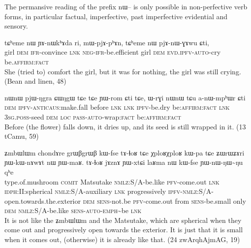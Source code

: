 \documentclass[oldfontcommands,oneside,a4paper,11pt]{article}
\newcommand{\ipa}[1]{{\phon \mbox{#1}}} %
\begin{document}
The permansive reading of the prefix \ipa{nɯ--} is only possible in non-perfective verb forms, in particular factual, imperfective, past imperfective evidential and sensory.


\begin{exe}
\ex \label{ex:pjAnWGAwu}
\gll
\ipa{tɕʰeme} 	\ipa{nɯ} 	\ipa{ɲɤ-nɯkʰɤda} 	\ipa{ri,} 	\ipa{mɯ-pjɤ-pʰɤn,} 	\ipa{tɕʰeme} 	\ipa{nɯ} 	\ipa{pjɤ-nɯ-ɣɤwu} 	\ipa{ɕti,} \\
girl \textsc{dem} \textsc{ifr}-convince \textsc{lnk} \textsc{neg-ifr}-be.efficient girl \textsc{dem} \textsc{evd.ipfv-auto}-cry  be.\textsc{affirm:fact} \\
\glt She (tried to) comfort the girl, but it was for nothing, the girl was still crying. (Bean and linen, 48)
\end{exe} 

\begin{exe}
\ex \label{ex:anWmphWr}
\gll
\ipa{nɯnɯ} 	\ipa{pjɯ-ŋgra} 	\ipa{ɕɯŋgɯ} 	\ipa{tɕe} 	\ipa{tɕe} 	\ipa{ɲɯ-rom} 	\ipa{ɕti} 	\ipa{tɕe,} 	\ipa{ɯ-rɣi} 	\ipa{nɯnɯ} 	\ipa{tɕu} 	\ipa{a-nɯ-mpʰɯr} 	\ipa{ɕti} \\
\textsc{dem} \textsc{ipfv-anticaus}:make.fall before \textsc{lnk}  \textsc{lnk} \textsc{ipfv}-be.dry be\textsc{:affirm:fact} \textsc{lnk} \textsc{3sg.poss}-seed \textsc{dem} \textsc{loc} \textsc{pass-auto}-wrap:\textsc{fact} be\textsc{:affirm:fact} \\
\glt Before (the flower) falls down, it dries up, and its seed is still wrapped in it. (13 tCamu, 59)
\end{exe} 


\begin{exe}
 \ex \label{ex:YWnWNWNu}
 \gll
\ipa{ʑmbɯlɯm}	\ipa{chondɤre}  	\ipa{grɯβgrɯβ}  	\ipa{kɯ-fse}  	\ipa{tɤ-ɬoʁ}  	\ipa{tɕe}  	\ipa{χploʁχploʁ}  	\ipa{kɯ-pa}  
\ipa{tɕe}  	\ipa{ʑɯrɯʑɤri}  	\ipa{ɲɯ-kɯ-nɤwɤt}  	\ipa{nɯ}  	\ipa{ɲɯ-maʁ.}  
\ipa{tɤ-ɬoʁ}  	\ipa{jɤznɤ}  	\ipa{ɲɯ-xtɕi}  	\ipa{laʁma}  	\ipa{nɯ}  	\ipa{kɯ-fse}  	\ipa{ɲɯ-nɯ-ŋɯ\textasciitilde{}ŋu}  	\ipa{qʰe}  	\\
type.of.mushroom \textsc{comit} Matsutake \textsc{nmlz}:S/A-be.like \textsc{pfv}-come.out \textsc{lnk} \textsc{idph:II:}spherical \textsc{nmlz}:S/A-auxiliary \textsc{lnk} progressively \textsc{ipfv}-\textsc{nmlz}:S/A-open.towards.the.exterior \textsc{dem} \textsc{sens}-not.be  \textsc{pfv}-come.out from \textsc{sens}-be.small only \textsc{dem} \textsc{nmlz}:S/A-be.like \textsc{sens-auto}-\textsc{emph}\textasciitilde{}be \textsc{lnk} \\
\glt It is not like the \ipa{ʑmbɯlɯm} and the Matsutake, which are spherical when they come out and progressively open towards the exterior. It is just that it is small when it comes out, (otherwise) it is already like that.
 (24 zwArqhAjmAG, 19)
 \end{exe}
\end{document}
